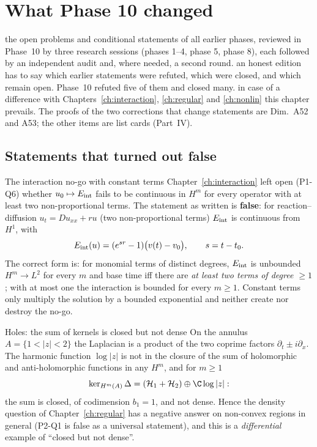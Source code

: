 \chapter{What Phase 10 changed}\label{ch:phase10}
\chapterbrief
{the open problems and conditional statements of all earlier phases, reviewed in Phase~10 by three research sessions (phases 1--4, phase 5, phase 8), each followed by an independent audit and, where needed, a second round.}
{an honest edition has to say which earlier statements were refuted, which were closed, and which remain open. Phase~10 refuted five of them and closed many.}
{in case of a difference with Chapters~\ref{ch:interaction}, \ref{ch:regular} and \ref{ch:nonlin} this chapter prevails. The proofs of the two corrections that change statements are Dim.~A52 and A53; the other items are list cards (Part~IV).}

\section{Statements that turned out false}

\begin{proposition}{The interaction no-go with constant terms  \proved}\label{thm:s10at1}
Chapter~\ref{ch:interaction} left open (P1-Q6) whether $u_0\mapsto E_{\rm int}$ fails to be continuous in $H^m$ for every operator with at least two non-proportional terms. The statement as written is \textbf{false}: for reaction--diffusion $u_t=Du_{xx}+ru$ (two non-proportional terms) $E_{\rm int}$ is continuous from $H^1$, with
\[
E_{\rm int}(u)=(e^{sr}-1)\big(v(t)-v_0\big),\qquad s=t-t_0 .
\]
The correct form is: for monomial terms of distinct degrees, $E_{\rm int}$ is unbounded $H^m\to L^2$ for every $m$ and base time iff there are \emph{at least two terms of degree $\ge1$}; with at most one the interaction is bounded for every $m\ge1$. Constant terms only multiply the solution by a bounded exponential and neither create nor destroy the no-go.
\end{proposition}

\begin{proposition}{Holes: the sum of kernels is closed but not dense  \proved}\label{prop:s10ap1}
On the annulus $A=\{1<|z|<2\}$ the Laplacian is a product of the two coprime factors $\partial_t\pm i\partial_x$. The harmonic function $\log|z|$ is not in the closure of the sum of holomorphic and anti-holomorphic functions in any $H^m$, and for $m\ge1$
\[
\ker_{H^m(A)}\Delta=(\mathcal H_1+\mathcal H_2)\oplus\C\log|z| :
\]
the sum is closed, of codimension $b_1=1$, and not dense. Hence the density question of Chapter~\ref{ch:regular} has a negative answer on non-convex regions in general (P2-Q1 is false as a universal statement), and this is a \emph{differential} example of ``closed but not dense''.
\end{proposition}

